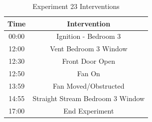 \documentclass{article}
\begin{document}
\begin{table}[H]
	\centering
	\caption{Experiment 23 Interventions}
	\begin{tabular}{|c|c|} 
		\hline
		Time & Intervention \\ \hline \hline
		00:00 & Ignition - Bedroom 3 \\ \hline
		12:00 & Vent Bedroom 3 Window \\ \hline
		12:30 & Front Door Open \\ \hline
		12:50 & Fan On \\ \hline
		13:59 & Fan Moved/Obstructed \\ \hline
		14:55 & Straight Stream Bedroom 3 Window \\ \hline
		17:00 & End Experiment \\ \hline
	\end{tabular}
	\label{Table:Exp23Interventions}
\end{table}

\clearpage
\end{document}
